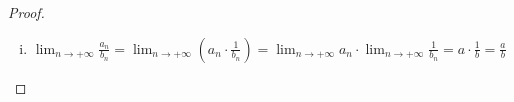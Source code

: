 \documentclass[a4paper,table]{report}
\begin{document}
\begin{proof}
\begin{enumerate}[i)]
\begin{proof}
      Για $ \varepsilon = \frac{\abs{b}}{2} >0 $ και λόγω 
      ότι $ \lim_{n \to +\infty} b_{n} = b $
      έχουμε ότι $ \exists n_{0} \in \mathbb{N} \; : \; 
      \forall n \geq n_{0} \quad \abs{b_{n}-b} 
      < \frac{\abs{b}}{2} $ 

      Άρα για $ n \geq n_{0} $, έχουμε 
      \begin{equation}\label{eq:idiot1/b}
        \abs{b} = \abs{b - b_{n} + b_{n}} \leq 
        \abs{b - b_{n}} + \abs{b_{n}} <
        \frac{\abs{b}}{2} + \abs{b_{n}} \Leftrightarrow 
        \abs{b_{n}} > \abs{b} -
        \frac{\abs{b}}{2} \Leftrightarrow \abs{b_{n}}  > 
        \frac{\abs{b}}{2} 
      \end{equation} 
      δηλαδή, $ b_{n} \neq 0, \; \forall n \geq n_{0} $.
      \qed 

      Οπότε, για $ n \geq n_{0} $ έχουμε ότι:

      \[ 
        \abs{\frac{1}{b_{n}} - \frac{1}{b}} = \abs{\frac{b-b_{n}}{b_{n}\cdot b}}
        = \frac{\abs{b-b_{n}} }{\abs{b_{n}} \cdot \abs{b}}
        \overset{\eqref{eq:idiot1/b}}{<} 
        \frac{2 \abs{b - b_{n}}}{\abs{b}^{2}} 
      \]

      Έστω $ \varepsilon >0 $, τότε επειδή 
      $ \lim_{n \to +\infty} b_{n} =b $, για 
      $ \frac{\varepsilon \abs{b} ^{2}}{2} > 0 $, έχουμε ότι
      \begin{equation}\label{eq:idiot1/b2}
        \exists n_{1} \in \mathbb{N} \; : \; \forall n 
        \geq n_{1} \quad \abs{b - b_{n}} <
        \frac{\varepsilon \abs{b}^{2}}{2}
      \end{equation} 

      Επιλέγουμε $ n_{2} = \max \{ n_{0}, n_{1} \} $. 
      Τότε $ \forall n \geq n_{2} $ ισχύει ότι 
      \[
        \abs{\frac{1}{b_{n}} - \frac{1}{b}} < 
        \frac{2 \abs{b -b_{n}}}{\abs{b} ^{2}} 
        \overset{\eqref{eq:idiot1/b2}}{<}  \varepsilon 
      \] 
    \end{proof}

  \item 
    $ \lim_{n \to +\infty} \frac{a_{n}}{b_{n}} = 
    \lim_{n \to +\infty} \left(a_{n}\cdot \frac{1}{b_{n}}
    \right) = \lim_{n \to +\infty} a_{n} \cdot \lim_{n \to +\infty} 
    \frac{1}{b_{n}} = a \cdot \frac{1}{b} = \frac{a}{b} $
\end{enumerate}
\end{proof}
\end{document}
